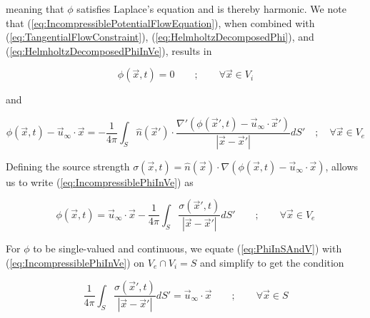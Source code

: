 \documentclass{article}
\begin{document}
meaning that $\phi$ satisfies Laplace's equation and is thereby harmonic. We
note that (\ref{eq:IncompressiblePotentialFlowEquation}), when combined with
(\ref{eq:TangentialFlowConstraint}), (\ref{eq:HelmholtzDecomposedPhi}), and
(\ref{eq:HelmholtzDecomposedPhiInVe}), results in

\begin{equation}
\label{eq:PhiInSAndV}
	\phi(\vec{x}, t) = 0 \qquad ; \qquad \forall \vec{x} \in V_i
\end{equation}

and

\begin{equation}
\label{eq:IncompressiblePhiInVe}
	\phi(\vec{x}, t) - \vec{u}_{\infty} \cdot \vec{x} = - \frac{1}{4 \pi}
	\int_S \hat{n}(\vec{x}') \cdot \frac{\nabla' \left( \phi(\vec{x}', t) -
	\vec{u}_{\infty} \cdot \vec{x}' \right)}{|\vec{x} - \vec{x}'|} dS' \quad ;
	\quad \forall \vec{x} \in V_e
\end{equation}

Defining the source strength $\sigma(\vec{x}, t) = \hat{n}(\vec{x}) \cdot \nabla
\left( \phi(\vec{x}, t) - \vec{u}_{\infty} \cdot \vec{x} \right)$, allows us to
write (\ref{eq:IncompressiblePhiInVe}) as

\begin{equation*}
	\phi(\vec{x}, t) = \vec{u}_{\infty} \cdot \vec{x} - \frac{1}{4 \pi} \int_S
	\frac{\sigma(\vec{x}', t)}{|\vec{x} - \vec{x}'|} dS' \qquad ; \qquad \forall
	\vec{x} \in V_e
\end{equation*}

For $\phi$ to be single-valued and continuous, we equate (\ref{eq:PhiInSAndV})
with (\ref{eq:IncompressiblePhiInVe}) on $V_e \cap V_i = S$ and simplify to get
the condition

\begin{equation*}
	\frac{1}{4 \pi} \int_S \frac{\sigma(\vec{x}', t)}{|\vec{x} - \vec{x}'|} dS'
	= \vec{u}_{\infty} \cdot \vec{x} \qquad ; \qquad \forall \vec{x} \in S
\end{equation*}
\end{document}
